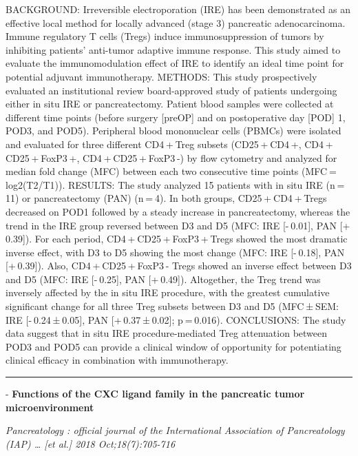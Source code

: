 \documentclass[]{article}
\begin{document}
BACKGROUND: Irreversible electroporation (IRE) has been demonstrated as
an effective local method for locally advanced (stage 3) pancreatic
adenocarcinoma. Immune regulatory T cells (Tregs) induce
immunosuppression of tumors by inhibiting patients' anti-tumor adaptive
immune response. This study aimed to evaluate the immunomodulation
effect of IRE to identify an ideal time point for potential adjuvant
immunotherapy. METHODS: This study prospectively evaluated an
institutional review board-approved study of patients undergoing either
in situ IRE or pancreatectomy. Patient blood samples were collected at
different time points (before surgery {[}preOP{]} and on postoperative
day {[}POD{]} 1, POD3, and POD5). Peripheral blood mononuclear cells
(PBMCs) were isolated and evaluated for three different CD4 + Treg
subsets (CD25 + CD4 +, CD4 + CD25 + FoxP3 +, CD4 + CD25 + FoxP3 -) by
flow cytometry and analyzed for median fold change (MFC) between each
two consecutive time points (MFC = log2(T2/T1)). RESULTS: The study
analyzed 15 patients with in situ IRE (n = 11) or pancreatectomy (PAN)
(n = 4). In both groups, CD25 + CD4 + Tregs decreased on POD1 followed
by a steady increase in pancreatectomy, whereas the trend in the IRE
group reversed between D3 and D5 (MFC: IRE {[}- 0.01{]}, PAN
{[}+ 0.39{]}). For each period, CD4 + CD25 + FoxP3 + Tregs showed the
most dramatic inverse effect, with D3 to D5 showing the most change
(MFC: IRE {[}- 0.18{]}, PAN {[}+ 0.39{]}). Also, CD4 + CD25 + FoxP3 -
Tregs showed an inverse effect between D3 and D5 (MFC: IRE {[}- 0.25{]},
PAN {[}+ 0.49{]}). Altogether, the Treg trend was inversely affected by
the in situ IRE procedure, with the greatest cumulative significant
change for all three Treg subsets between D3 and D5 (MFC ± SEM: IRE
{[}- 0.24 ± 0.05{]}, PAN {[}+ 0.37 ± 0.02{]}; p = 0.016). CONCLUSIONS:
The study data suggest that in situ IRE procedure-mediated Treg
attenuation between POD3 and POD5 can provide a clinical window of
opportunity for potentiating clinical efficacy in combination with
immunotherapy.

{}

{}

\begin{center}\rule{0.5\linewidth}{\linethickness}\end{center}

 - \textbf{Functions of the CXC ligand family in the pancreatic tumor
microenvironment}

\emph{Pancreatology : official journal of the International Association
of Pancreatology (IAP) \ldots{} {[}et al.{]} 2018 Oct;18(7):705-716}
\end{document}
